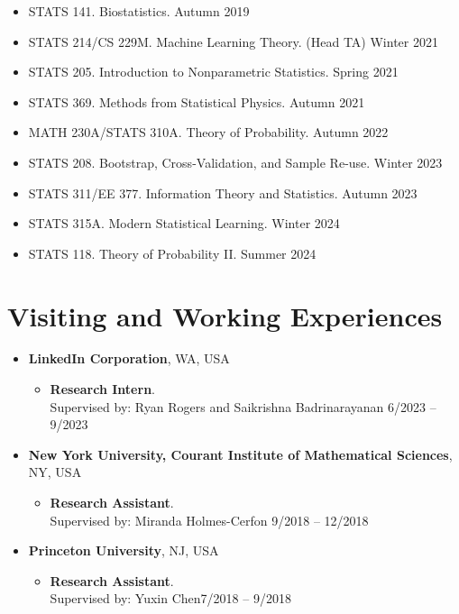 \documentclass[10pt, a4paper]{article}
\newcommand{\cvdategap}{\hspace{1.5em}\hfill}
\begin{document}
\begin{itemize}
	\item[--] STATS 141. Biostatistics. \cvdategap Autumn 2019
	\item[--] STATS 214/CS 229M. Machine Learning Theory. (Head TA) \cvdategap Winter 2021
	\item[--] STATS 205. Introduction to Nonparametric Statistics. \cvdategap Spring 2021
	\item[--] STATS 369. Methods from Statistical Physics. \cvdategap Autumn 2021
	\item[--] MATH 230A/STATS 310A. Theory of Probability. \cvdategap Autumn 2022
	\item[--] STATS 208. Bootstrap, Cross-Validation, and Sample Re-use. \cvdategap Winter 2023
	\item[--] STATS 311/EE 377. Information Theory and Statistics. \cvdategap Autumn 2023
	\item[--] STATS 315A. Modern Statistical Learning. \cvdategap Winter 2024
	\item[--] STATS 118. Theory of Probability II. \cvdategap Summer 2024
\end{itemize}

\section*{\textbf{Visiting and Working Experiences}}
\begin{itemize}
	\item[] \textbf{LinkedIn Corporation}, WA, USA
	\begin{itemize}
		\item [--] \textbf{Research Intern}. \\[2pt]
		Supervised by: Ryan Rogers and Saikrishna Badrinarayanan  \cvdategap 6/2023 -- 9/2023
	\end{itemize}
	\item[] \textbf{New York University, Courant Institute of Mathematical Sciences}, NY, USA
	\begin{itemize}
		\item [--] \textbf{Research Assistant}. \\[2pt]
		Supervised by: Miranda Holmes-Cerfon \cvdategap 9/2018 -- 12/2018
	\end{itemize}
	\item[] \textbf{Princeton University}, NJ, USA
	\begin{itemize}
		\item [--] \textbf{Research Assistant}. \\[2pt]
		Supervised by: Yuxin Chen\cvdategap 7/2018 -- 9/2018
	\end{itemize}
\end{itemize}
\end{document}
